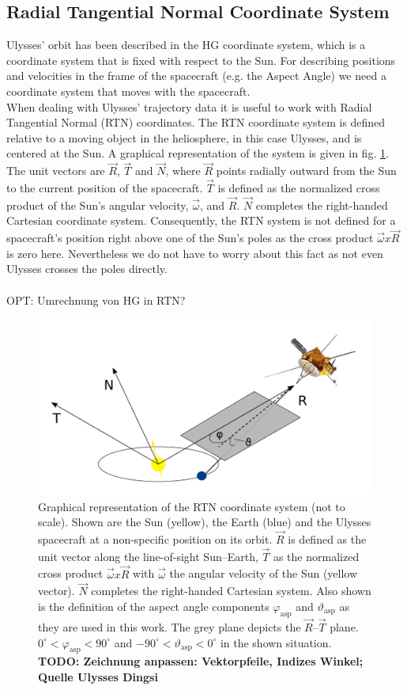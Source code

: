 \subsection{Radial Tangential Normal Coordinate System}
Ulysses' orbit has been described in the HG coordinate system, which is a coordinate system that is fixed with respect to the Sun. For describing positions and velocities in the frame of the spacecraft (e.g. the Aspect Angle) we need a coordinate system that moves with the spacecraft.
\\
When dealing with Ulysses' trajectory data it is useful to work with Radial Tangential Normal (RTN) coordinates. The RTN coordinate system is defined relative to a moving object in the heliosphere, in this case Ulysses, and is centered at the Sun. A graphical representation of the system is given in fig. \ref{fig:rtn}. The unit vectors are $\vec{R}$, $\vec{T}$ and $\vec{N}$, where $\vec{R}$ points radially outward from the Sun to the current position of the spacecraft. $\vec{T}$ is defined as the normalized cross product of the Sun's angular velocity, $\vec{\omega}$, and $\vec{R}$. $\vec{N}$ completes the right-handed Cartesian coordinate system. Consequently, the RTN system is not defined for a spacecraft's position right above one of the Sun's poles as the cross product $\vec{\omega} x \vec{R}$ is zero here. Nevertheless we do not have to worry about this fact as not even Ulysses crosses the poles directly.
\\ \\
OPT: Umrechnung von HG in RTN?
%
%
\begin{figure}[h]
	\includegraphics[width=1\textwidth]{Figures/RTN_AA_angles.pdf}
	\centering
	\caption{Graphical representation of the RTN coordinate system (not to scale). Shown are the Sun (yellow), the Earth (blue) and the Ulysses spacecraft at a non-specific position on its orbit. $\vec{R}$ is defined as the unit vector along the line-of-sight Sun--Earth, $\vec{T}$ as the normalized cross product $\vec{\omega} x \vec{R}$ with $\vec{\omega}$ the angular velocity of the Sun (yellow vector). $\vec{N}$ completes the right-handed Cartesian system. Also shown is the definition of the aspect angle components $\varphi_{\mathrm{asp}}$ and $\vartheta_{\mathrm{asp}}$ as they are used in this work. The grey plane depicts the $\vec{R}$--$\vec{T}$ plane. $0 ^\circ < \varphi_{\mathrm{asp}} < 90^\circ$ and $-90 ^\circ < \vartheta_{\mathrm{asp}} < 0^\circ$ in the shown situation. \textbf{TODO: Zeichnung anpassen: Vektorpfeile, Indizes Winkel; Quelle Ulysses Dingsi}}
	\label{fig:rtn}
\end{figure}
%
%
%

